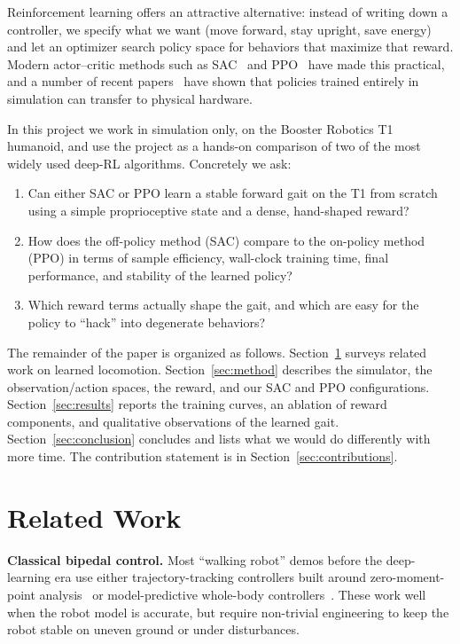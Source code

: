 \documentclass[sigconf,nonacm]{acmart}
\begin{document}
Reinforcement learning offers an attractive alternative: instead of writing down
a controller, we specify what we want (move forward, stay upright, save energy)
and let an optimizer search policy space for behaviors that maximize that
reward. Modern actor--critic methods such as SAC~\cite{haarnoja2018sac} and
PPO~\cite{schulman2017ppo} have made this practical, and a number of recent
papers~\cite{rudin2022learn,siekmann2021sim2real} have shown that policies
trained entirely in simulation can transfer to physical hardware.

In this project we work in simulation only, on the Booster Robotics T1 humanoid,
and use the project as a hands-on comparison of two of the most widely used
deep-RL algorithms. Concretely we ask:

\begin{enumerate}
\item Can either SAC or PPO learn a stable forward gait on the T1 from scratch
  using a simple proprioceptive state and a dense, hand-shaped reward?
\item How does the off-policy method (SAC) compare to the on-policy method
  (PPO) in terms of sample efficiency, wall-clock training time, final
  performance, and stability of the learned policy?
\item Which reward terms actually shape the gait, and which are easy for the
  policy to ``hack'' into degenerate behaviors?
\end{enumerate}

The remainder of the paper is organized as follows. Section~\ref{sec:related}
surveys related work on learned locomotion. Section~\ref{sec:method} describes
the simulator, the observation/action spaces, the reward, and our SAC and PPO
configurations. Section~\ref{sec:results} reports the training curves, an
ablation of reward components, and qualitative observations of the learned
gait. Section~\ref{sec:conclusion} concludes and lists what we would do
differently with more time. The contribution statement is in
Section~\ref{sec:contributions}.

\section{Related Work}\label{sec:related}
\textbf{Classical bipedal control.} Most ``walking robot'' demos before the
deep-learning era use either trajectory-tracking controllers built around
zero-moment-point analysis~\cite{kajita2003zmp} or model-predictive whole-body
controllers~\cite{koenemann2015whole}. These work well when the robot model is
accurate, but require non-trivial engineering to keep the robot stable on
uneven ground or under disturbances.
\end{document}
